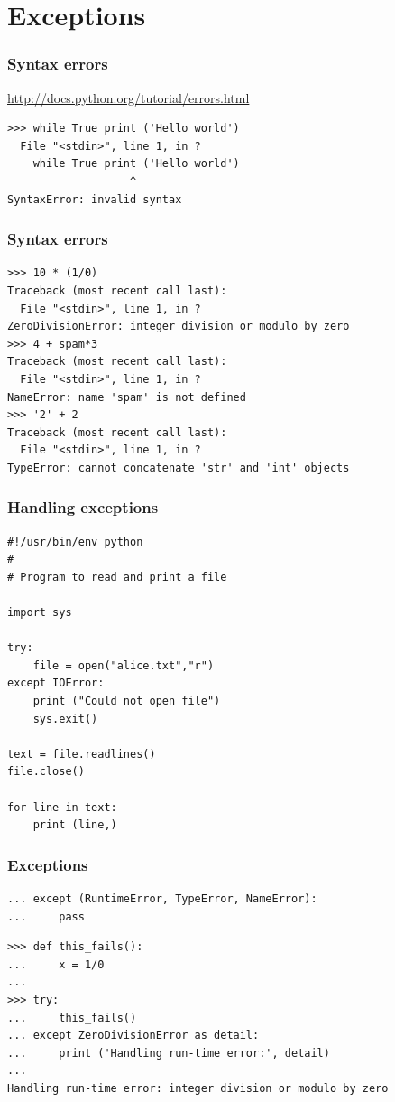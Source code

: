 \documentclass{beamer}
\begin{document}
\section{Exceptions}

\begin{frame}[containsverbatim]
\frametitle{Syntax errors}
\url{http://docs.python.org/tutorial/errors.html}
\begin{lstlisting}
>>> while True print ('Hello world')
  File "<stdin>", line 1, in ?
    while True print ('Hello world')
                   ^
SyntaxError: invalid syntax
\end{lstlisting}
\end{frame}

\begin{frame}[containsverbatim]
\frametitle{Syntax errors}
\begin{lstlisting}
>>> 10 * (1/0)
Traceback (most recent call last):
  File "<stdin>", line 1, in ?
ZeroDivisionError: integer division or modulo by zero
>>> 4 + spam*3
Traceback (most recent call last):
  File "<stdin>", line 1, in ?
NameError: name 'spam' is not defined
>>> '2' + 2
Traceback (most recent call last):
  File "<stdin>", line 1, in ?
TypeError: cannot concatenate 'str' and 'int' objects
\end{lstlisting}
\end{frame}

\begin{frame}[containsverbatim]
\frametitle{Handling exceptions}
\begin{lstlisting}
#!/usr/bin/env python
#
# Program to read and print a file 

import sys

try:
    file = open("alice.txt","r")
except IOError:
    print ("Could not open file")
    sys.exit()

text = file.readlines()
file.close()

for line in text:
    print (line,)

\end{lstlisting}
\end{frame}

\begin{frame}[containsverbatim]
\frametitle{Exceptions}
\begin{lstlisting}
... except (RuntimeError, TypeError, NameError):
...     pass
\end{lstlisting}

\begin{lstlisting}
>>> def this_fails():
...     x = 1/0
...
>>> try:
...     this_fails()
... except ZeroDivisionError as detail:
...     print ('Handling run-time error:', detail)
...
Handling run-time error: integer division or modulo by zero
\end{lstlisting}
\end{frame}
\end{document}
